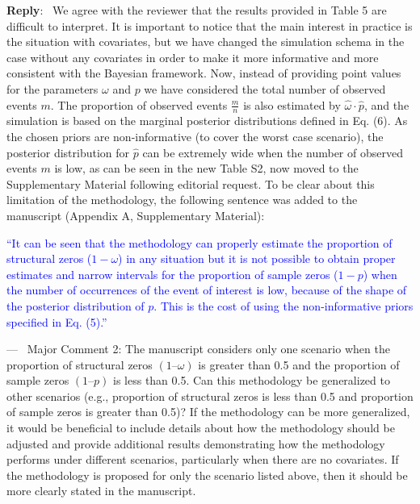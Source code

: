 \documentclass[11pt]{article}
\newcounter{reviewer}
\newcounter{point}[reviewer]
\renewcommand{\thepoint}{C\,\arabic{point}}
\newenvironment{point}
   {\refstepcounter{point} \bigskip \noindent {\textbf{Reviewer~Comment~\thepoint} } ---\ }
   {\par }
\newenvironment{reply}
   {\medskip \noindent \begin{sf}\textbf{Reply}:\  }
   {\medskip \end{sf}}
\begin{document}
\begin{reply}
We agree with the reviewer that the results provided in Table 5 are difficult to interpret. It is important to notice that the main interest in practice is the situation with covariates, but we have changed the simulation schema in the case without any covariates in order to make it more informative and more consistent with the Bayesian framework. Now, instead of providing point values for the parameters $\omega$ and $p$ we have considered the total number of observed events $m$. The proportion of observed events $\frac{m}{n}$ is also estimated by $\hat{\omega} \cdot \hat{p}$, and the simulation is based on the marginal posterior distributions defined in Eq. (6). As the chosen priors are non-informative (to cover the worst case scenario), the posterior distribution for $\hat{p}$ can be extremely wide when the number of observed events $m$ is low, as can be seen in the new Table S2, now moved to the Supplementary Material following editorial request. To be clear about this limitation of the methodology, the following sentence was added to the manuscript (Appendix A, Supplementary Material):

\textcolor{blue}{``It can be seen that the methodology can properly estimate the proportion of structural zeros ($1-\omega$) in any situation but it is not possible to obtain proper estimates and narrow intervals for the proportion of sample zeros ($1-p$) when the number of occurrences of the event of interest is low, because of the shape of the posterior distribution of $p$. This is the cost of using the non-informative priors specified in Eq. (5).''}

\end{reply}

\begin{point}
Major Comment 2: The manuscript considers only one scenario when the proportion of structural zeros $(1 – \omega)$ is greater than 0.5 and the proportion of sample zeros $(1 – p)$ is less than 0.5. Can this methodology be generalized to other scenarios (e.g., proportion of structural zeros is less than 0.5 and proportion of sample zeros is greater than 0.5)? If the methodology can be more generalized, it would be beneficial to include details about how the methodology should be adjusted and provide additional results demonstrating how the methodology performs under different scenarios, particularly when there are no covariates. If the methodology is proposed for only the scenario listed above, then it should be more clearly stated in the manuscript.
	\label{pt:C3}
\end{point}
\end{document}
